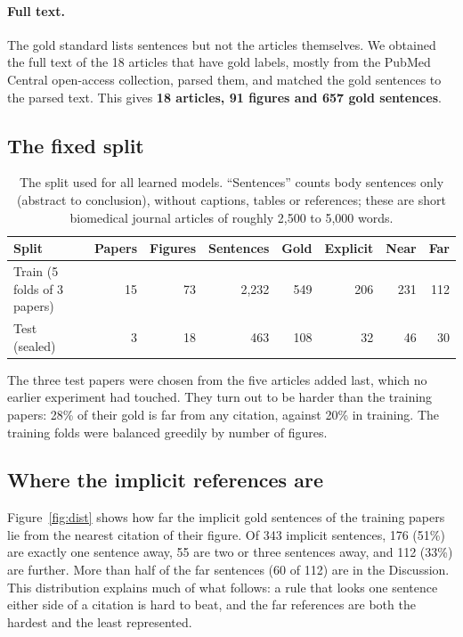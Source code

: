 \paragraph{Full text.} The gold standard lists sentences but not the articles themselves. We obtained the full
text of the 18 articles that have gold labels, mostly from the PubMed Central open-access collection, parsed
them, and matched the gold sentences to the parsed text. This gives \textbf{18 articles, 91 figures and 657
gold sentences}.

\subsection{The fixed split}
\label{sec:split}
\begin{table}[h]
\centering
\small
\begin{tabular}{lrrrrrrr}
\toprule
Split & Papers & Figures & Sentences & Gold & Explicit & Near & Far\\
\midrule
Train (5 folds of 3 papers) & 15 & 73 & 2{,}232 & 549 & 206 & 231 & 112\\
Test (sealed)               &  3 & 18 &   463 & 108 &  32 &  46 &  30\\
\bottomrule
\end{tabular}
\caption{The split used for all learned models. ``Sentences'' counts body sentences only (abstract to
conclusion), without captions, tables or references; these are short biomedical journal articles of roughly
2{,}500 to 5{,}000 words.}
\label{tab:split}
\end{table}

The three test papers were chosen from the five articles added last, which no earlier experiment had
touched. They turn out to be harder than the training papers: 28\% of their gold is far from any citation,
against 20\% in training. The training folds were balanced greedily by number of figures.

\subsection{Where the implicit references are}
Figure~\ref{fig:dist} shows how far the implicit gold sentences of the training papers lie from the nearest
citation of their figure. Of 343 implicit sentences, 176 (51\%) are exactly one sentence away, 55 are two or
three sentences away, and 112 (33\%) are further. More than half of the far sentences (60 of 112) are in the
Discussion. This distribution explains much of what follows: a rule that looks one sentence either side of a
citation is hard to beat, and the far references are both the hardest and the least represented.


